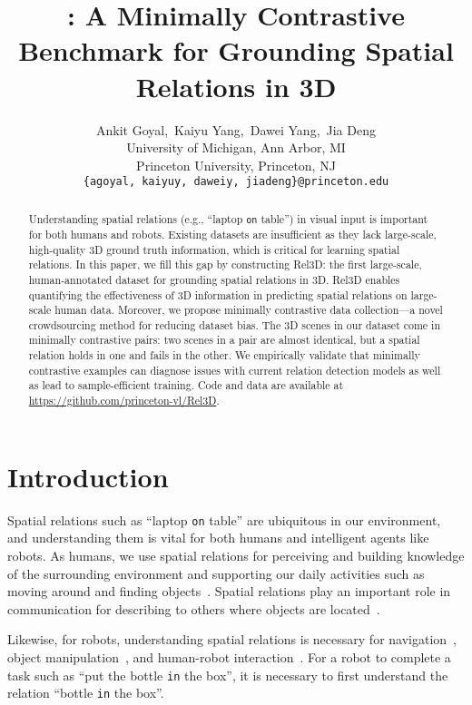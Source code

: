 \documentclass{article}
\title{\datasetname: A Minimally Contrastive Benchmark for Grounding Spatial Relations in 3D}
\author{Ankit Goyal,\, Kaiyu Yang,\, Dawei Yang,\, Jia Deng\\
University of Michigan, Ann Arbor, MI\\
Princeton University, Princeton, NJ \\
\texttt{\{agoyal, kaiyuy, daweiy, jiadeng\}@princeton.edu} 
}
\newcommand\datasetname{Rel3D}
\begin{document}
\maketitle

\begin{abstract}
Understanding spatial relations (e.g., ``laptop \texttt{on} table'') in visual input is important for both humans and robots. Existing datasets are insufficient as they lack large-scale, high-quality 3D ground truth information, which is critical for learning spatial relations. In this paper, we fill this gap by constructing \datasetname: the first large-scale, human-annotated dataset for grounding spatial relations in 3D. {\datasetname } enables quantifying the effectiveness of 3D information in predicting spatial relations on large-scale human data. Moreover, we propose minimally contrastive data collection---a novel crowdsourcing method for reducing dataset bias. The 3D scenes in our dataset come in minimally contrastive pairs: two scenes in a pair are almost identical, but a spatial relation holds in one and fails in the other. We empirically validate that minimally contrastive examples can diagnose issues with current relation detection models as well as lead to sample-efficient training. Code and data are available at \url{https://github.com/princeton-vl/Rel3D}.
\end{abstract}

\section{Introduction}
Spatial relations such as ``laptop \texttt{on} table'' are ubiquitous in our environment, and understanding them is vital for both humans and intelligent agents like robots. As humans, we use spatial relations for perceiving and building knowledge of the surrounding environment and supporting our daily activities such as moving around and finding objects~\cite{brooks1968spatial,freeman1975modelling}. Spatial relations play an important role in communication for describing to others where objects are located~\cite{talmy1983language,herskovits1985semantics,landau1993and,golland2010game}.

Likewise, for robots, understanding spatial relations is necessary for navigation~\cite{boularias2015grounding},  object manipulation~\cite{zampogiannis2015learning,zeng2018semantic}, and human-robot interaction~\cite{skubic2004spatial,guadarrama2013grounding}. For a robot to complete a task such as ``put the bottle \texttt{in} the box'', it is necessary to first understand the relation ``bottle \texttt{in} the box''. 
\end{document}
